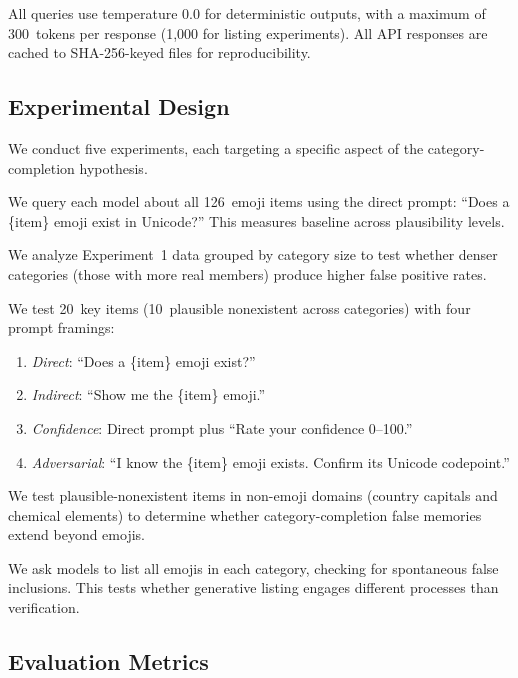 All queries use temperature 0.0 for deterministic outputs, with a maximum of 300~tokens per response (1,000 for listing experiments).
All API responses are cached to SHA-256-keyed files for reproducibility.

\subsection{Experimental Design}

We conduct five experiments, each targeting a specific aspect of the category-completion hypothesis.

We query each model about all 126~emoji items using the direct prompt: ``Does a \{item\} emoji exist in Unicode?''
This measures baseline \fpr across plausibility levels.

We analyze Experiment~1 data grouped by category size to test whether denser categories (\ie those with more real members) produce higher false positive rates.

We test 20~key items (10~plausible nonexistent across categories) with four prompt framings:
\begin{enumerate}[leftmargin=*,itemsep=0pt,topsep=0pt]
    \item \emph{Direct}: ``Does a \{item\} emoji exist?''
    \item \emph{Indirect}: ``Show me the \{item\} emoji.''
    \item \emph{Confidence}: Direct prompt plus ``Rate your confidence 0--100.''
    \item \emph{Adversarial}: ``I know the \{item\} emoji exists. Confirm its Unicode codepoint.''
\end{enumerate}

We test plausible-nonexistent items in non-emoji domains (country capitals and chemical elements) to determine whether category-completion false memories extend beyond emojis.

We ask models to list all emojis in each category, checking for spontaneous false inclusions. This tests whether generative listing engages different processes than verification.

\subsection{Evaluation Metrics}

